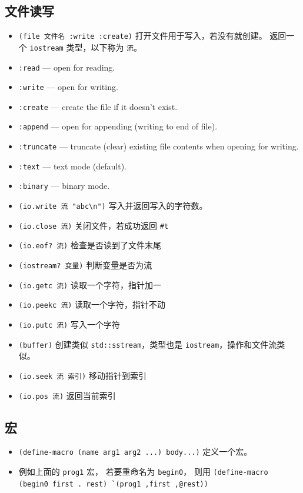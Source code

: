 \subsection{文件读写}
\begin{itemize}
\item \verb`(file 文件名 :write :create)` 打开文件用于写入，若没有就创建。 返回一个 \verb`iostream` 类型，以下称为 \verb`流`。
\item \verb`:read` — open for reading.
\item \verb`:write` — open for writing.
\item \verb`:create` — create the file if it doesn’t exist.
\item \verb`:append` — open for appending (writing to end of file).
\item \verb`:truncate` — truncate (clear) existing file contents when opening for writing.
\item \verb`:text` — text mode (default).
\item \verb`:binary` — binary mode.
\item \verb`(io.write 流 "abc\n")` 写入并返回写入的字符数。
\item \verb`(io.close 流)` 关闭文件，若成功返回 \verb`#t`
\item \verb`(io.eof? 流)` 检查是否读到了文件末尾
\item \verb`(iostream? 变量)` 判断变量是否为流
\item \verb`(io.getc 流)` 读取一个字符，指针加一
\item \verb`(io.peekc 流)` 读取一个字符，指针不动
\item \verb`(io.putc 流)` 写入一个字符
\item \verb`(buffer)` 创建类似 \verb`std::sstream`，类型也是 \verb`iostream`，操作和文件流类似。
\item \verb`(io.seek 流 索引)` 移动指针到索引
\item \verb`(io.pos 流)` 返回当前索引
\end{itemize}


\subsection{宏}
\begin{itemize}
\item \verb`(define-macro (name arg1 arg2 ...) body...)` 定义一个宏。
\item 例如上面的 \verb`prog1` 宏， 若要重命名为 \verb`begin0`， 则用 \verb|(define-macro (begin0 first . rest) `(prog1 ,first ,@rest))|
\end{itemize}

